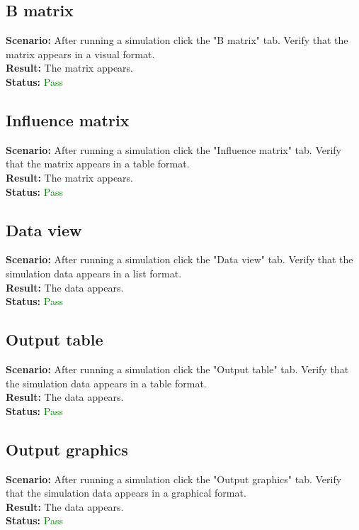 \documentclass[a4paper, 11pt, article]{report}
\begin{document}
\subsection{B matrix}

\noindent \textbf{Scenario:} After running a simulation click the "B matrix" tab. Verify that the matrix appears in a visual format.
\\
\noindent \textbf{Result:} The matrix appears.
\\
\noindent \textbf{Status:} \textcolor{green}{Pass}

\subsection{Influence matrix}

\noindent \textbf{Scenario:} After running a simulation click the "Influence matrix" tab. Verify that the matrix appears in a table format.
\\
\noindent \textbf{Result:} The matrix appears.
\\
\noindent \textbf{Status:} \textcolor{green}{Pass}

\subsection{Data view}

\noindent \textbf{Scenario:} After running a simulation click the "Data view" tab. Verify that the simulation data appears in a list format.
\\
\noindent \textbf{Result:} The data appears.
\\
\noindent \textbf{Status:} \textcolor{green}{Pass}

\subsection{Output table}

\noindent \textbf{Scenario:} After running a simulation click the "Output table" tab. Verify that the simulation data appears in a table format.
\\
\noindent \textbf{Result:} The data appears.
\\
\noindent \textbf{Status:} \textcolor{green}{Pass}

\subsection{Output graphics}

\noindent \textbf{Scenario:} After running a simulation click the "Output graphics" tab. Verify that the simulation data appears in a graphical format.
\\
\noindent \textbf{Result:} The data appears.
\\
\noindent \textbf{Status:} \textcolor{green}{Pass}
\end{document}
